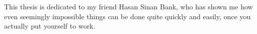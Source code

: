 \noindent This thesis is dedicated to my friend Hasan Sinan Bank, who has shown me how even seemingly impossible things can be done quite quickly and easily, once you actually put yourself to work.